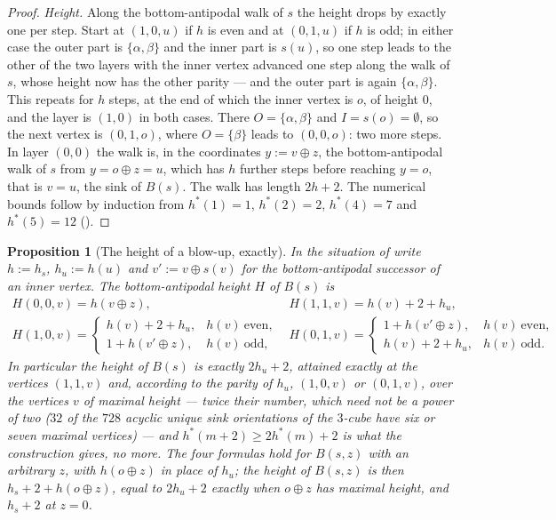 \documentclass[11pt]{article}
\theoremstyle{plain}
\newtheorem{proposition}[theorem]{Proposition}
\theoremstyle{definition}
\begin{document}
\begin{proof}
\emph{Height.} Along the bottom-antipodal walk of $s$ the height drops by
exactly one per step. Start at $(1,0,u)$ if $h$ is even and at $(0,1,u)$
if $h$ is odd; in either case the outer part is $\{\alpha,\beta\}$ and the
inner part is $s(u)$, so one step leads to the other of the two layers
with the inner vertex advanced one step along the walk of $s$, whose
height now has the other parity --- and the outer part is again
$\{\alpha,\beta\}$. This repeats for $h$ steps, at the end of which the
inner vertex is $o$, of height $0$, and the layer is $(1,0)$ in both
cases. There $O=\{\alpha,\beta\}$ and $I=s(o)=\emptyset$, so the next
vertex is $(0,1,o)$, where $O=\{\beta\}$ leads to $(0,0,o)$: two more
steps. In layer $(0,0)$ the walk is, in the coordinates $y:=v\oplus z$,
the bottom-antipodal walk of $s$ from $y=o\oplus z=u$, which has $h$
further steps before reaching $y=o$, that is $v=u$, the sink of $B(s)$.
The walk has length $2h+2$. The numerical bounds follow by induction from
$h^{\ast}(1)=1$, $h^{\ast}(2)=2$, $h^{\ast}(4)=7$ and $h^{\ast}(5)=12$
().
\end{proof}

\begin{proposition}[The height of a blow-up, exactly]\label{prop:blowup-height}
In the situation of  write $h:=h_s$, $h_u:=h(u)$ and
$v':=v\oplus s(v)$ for the bottom-antipodal successor of an inner vertex.
The bottom-antipodal height $H$ of $B(s)$ is
\[
\begin{array}{ll}
 H(0,0,v)=h(v\oplus z), &
 H(1,1,v)=h(v)+2+h_u,\\[2pt]
 H(1,0,v)=\begin{cases} h(v)+2+h_u,& h(v)\ \text{even},\\
                        1+h(v'\oplus z),& h(v)\ \text{odd},\end{cases} &
 H(0,1,v)=\begin{cases} 1+h(v'\oplus z),& h(v)\ \text{even},\\
                        h(v)+2+h_u,& h(v)\ \text{odd}.\end{cases}
\end{array}
\]
In particular the height of $B(s)$ is exactly $2h_u+2$, attained exactly
at the vertices $(1,1,v)$ and, according to the parity of $h_u$, $(1,0,v)$
or $(0,1,v)$, over the vertices $v$ of maximal height --- twice their
number, which need not be a power of two ($32$ of the $728$ acyclic
unique sink orientations of the $3$-cube have six or seven maximal
vertices) --- and $h^{\ast}(m+2)\ge2h^{\ast}(m)+2$ is what the construction
gives, no more. The four formulas hold for $B(s,z)$ with an arbitrary $z$,
with $h(o\oplus z)$ in place of $h_u$; the height of $B(s,z)$ is then
$h_s+2+h(o\oplus z)$, equal to $2h_u+2$ exactly when $o\oplus z$ has
maximal height, and $h_s+2$ at $z=0$.
\end{proposition}
\end{document}
